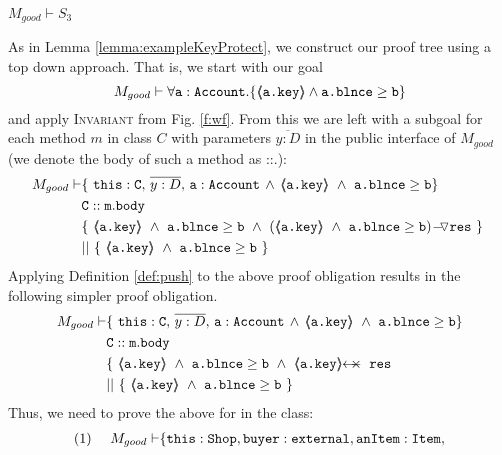 \begin{lemma}
$M_{good} \vdash S_3$
\end{lemma}


\begin{proofO}
As in Lemma \ref{lemma:exampleKeyProtect}, we construct our proof tree using a top down approach.  That is, we start with our goal
$$M_{good} \vdash \forall {\mbox{\normalfont{\texttt{a}}}:\mbox{\normalfont{\texttt{Account}}}}.{{\{}}{\langle\!\!\langle \mbox{\normalfont{\texttt{a.key}}} \rangle\!\!\rangle \wedge \mbox{\normalfont{\texttt{a.blnce}}} \geq \mbox{\normalfont{\texttt{b}}}}{{\}}}$$
and apply  \textsc{Invariant} from Fig. \ref{f:wf}.
From this we are left with a subgoal for each method $m$ in  class $C$ with parameters $\overline{y:D}$ in the public interface of $M_{good}$ (we denote the body of such a method as ::.):
\small
\begin{align*}
M_{good} \vdash
		& \{ \ \prg{this}:\prg{C},\, \overline{y:D},\, \prg{a}:\prg{Account}\, \wedge\,
		   {\inside{\prg{a.key}}}\ \wedge\ {\prg{a.blnce} \geq \prg{b}}\} \\
		& \prg{C}::\prg{m}.\prg{body}\ \\
		& \{\ {\inside{\prg{a.key}}\ \wedge\ {\prg{a.blnce} \geq \prg{b}}}\ 
		\wedge\ {\PushASLong {\prg{res}} 
							{(\inside{\prg{a.key}}\ \wedge\ 
							 {\prg{a.blnce} \geq \prg{b}})}}\ \}\ \\
		& ||\ \{\ {\inside{\prg{a.key}}\ \wedge\ 
							 {\prg{a.blnce} \geq \prg{b}}}\ \} 
\end{align*}
\normalsize
Applying Definition \ref{def:push} to the above proof obligation results in the following 
simpler proof obligation.
\small
\begin{align*}
M_{good} \vdash
		& \{ \ \prg{this}:\prg{C},\, \overline{y:D},\, \prg{a}:\prg{Account}\, \wedge\,
		   {\inside{\prg{a.key}}}\ \wedge\ {\prg{a.blnce} \geq \prg{b}}\} \\
		& \prg{C}::\prg{m}.\prg{body}\ \\
		& \{\ {\inside{\prg{a.key}}\ \wedge\ {\prg{a.blnce} \geq \prg{b}}}\ 
		\wedge\ {\protectedFrom{\prg{a.key}}{\prg{res}}}\ \\
		& ||\ \{\ {\inside{\prg{a.key}}\ \wedge\ 
							 {\prg{a.blnce} \geq \prg{b}}}\ \}
\end{align*}
\normalsize
Thus, we need to prove the above for \prg{buy} in the  class:
\small
\begin{align*}
\text{(1)}  \ \ \ \ M_{good} \vdash 
		&	\{  \prg{this}:\prg{Shop}, \prg{buyer} : \prg{external}, 
		\prg{anItem} : \prg{Item},\\

\end{align*}
\end{proofO}
